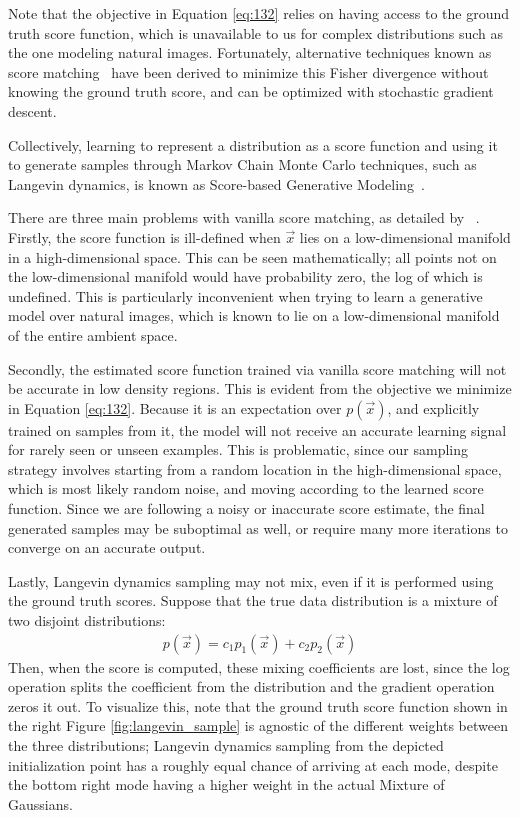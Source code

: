 Note that the objective in Equation \ref{eq:132} relies on having access to the ground truth score function, which is unavailable to us for complex distributions such as the one modeling natural images.  Fortunately, alternative techniques known as score matching~\cite{hyvarinen2005estimation, saremi2018deep, song2020sliced, vincent2011connection} have been derived to minimize this Fisher divergence without knowing the ground truth score, and can be optimized with stochastic gradient descent.

Collectively, learning to represent a distribution as a score function and using it to generate samples through Markov Chain Monte Carlo techniques, such as Langevin dynamics, is known as Score-based Generative Modeling~\cite{song2019generative, song2020score, song2020improved}.

There are three main problems with vanilla score matching, as detailed by ~\citet{song2019generative}.  Firstly, the score function is ill-defined when $\vec{x}$ lies on a low-dimensional manifold in a high-dimensional space.  This can be seen mathematically; all points not on the low-dimensional manifold would have probability zero, the log of which is undefined.  This is particularly inconvenient when trying to learn a generative model over natural images, which is known to lie on a low-dimensional manifold of the entire ambient space.

Secondly, the estimated score function trained via vanilla score matching will not be accurate in low density regions.  This is evident from the objective we minimize in Equation \ref{eq:132}.  Because it is an expectation over $p(\vec{x})$, and explicitly trained on samples from it, the model will not receive an accurate learning signal for rarely seen or unseen examples.  This is problematic, since our sampling strategy involves starting from a random location in the high-dimensional space, which is most likely random noise, and moving according to the learned score function.  Since we are following a noisy or inaccurate score estimate, the final generated samples may be suboptimal as well, or require many more iterations to converge on an accurate output.

Lastly, Langevin dynamics sampling may not mix, even if it is performed using the ground truth scores.  Suppose that the true data distribution is a mixture of two disjoint distributions:
\begin{align}
    p(\vec{x}) = c_1p_1(\vec{x}) + c_2p_2(\vec{x})
\end{align}
Then, when the score is computed, these mixing coefficients are lost, since the log operation splits the coefficient from the distribution and the gradient operation zeros it out.  To visualize this, note that the ground truth score function shown in the right Figure \ref{fig:langevin_sample} is agnostic of the different weights between the three distributions; Langevin dynamics sampling from the depicted initialization point has a roughly equal chance of arriving at each mode, despite the bottom right mode having a higher weight in the actual Mixture of Gaussians.

